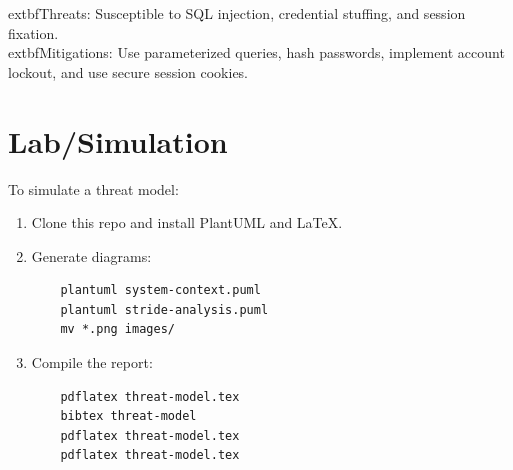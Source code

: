 \documentclass{article}
\begin{document}
	extbf{Threats:} Susceptible to SQL injection, credential stuffing, and session fixation.\\
	extbf{Mitigations:} Use parameterized queries, hash passwords, implement account lockout, and use secure session cookies.

\section{Lab/Simulation}
To simulate a threat model:
\begin{enumerate}
    \item Clone this repo and install PlantUML and LaTeX.
    \item Generate diagrams:
    \begin{verbatim}
    plantuml system-context.puml
    plantuml stride-analysis.puml
    mv *.png images/
    \end{verbatim}
    \item Compile the report:
    \begin{verbatim}
    pdflatex threat-model.tex
    bibtex threat-model
    pdflatex threat-model.tex
    pdflatex threat-model.tex
    \end{verbatim}
\end{enumerate}



\end{document}
